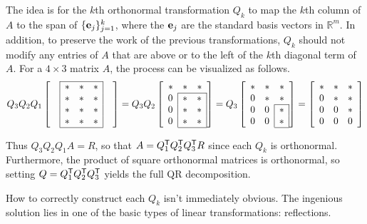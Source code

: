 The idea is for the $k$th orthonormal transformation $Q_k$ to map the $k$th column of $A$ to the span of $\{\mathbf{e}_j\}_{j=1}^k$, where the $\mathbf{e}_j$ are the standard basis vectors in $\mathbb{R}^m$.
In addition, to preserve the work of the previous transformations, $Q_k$ should not modify any entries of $A$ that are above or to the left of the $k$th diagonal term of $A$.
For a $4 \times 3$ matrix $A$, the process can be visualized as follows.
%
\begin{align*}
Q_3 Q_2 Q_1
\left[\begin{array}{ccccc}
\cline{2-4}
& \lvl{*} & * & \rvl{*} & \\
& \lvl{*} & * & \rvl{*}& \\
& \lvl{*} & * & \rvl{*} & \\
& \lvl{*} & * & \rvl{*} & \\ \cline{2-4}
\end{array}\right]
= Q_3 Q_2
\left[\begin{array}{ccc}
     *  & * &      * \\
\cline{2-3}
\rvl{0} & * & \rvl{*} \\
\rvl{0} & * & \rvl{*} \\
\rvl{0} & * & \rvl{*} \\
\cline{2-3}
\end{array}\right]
= Q_3
\left[\begin{array}{ccc}
* & * & * \\
0 & * & * \\
\cline{3-3}
0 & \rvl{0} & \rvl{*} \\
0 & \rvl{0} & \rvl{*} \\
\cline{3-3}
\end{array}\right]
=
\left[\begin{array}{ccc}
* & * & * \\
0 & * & * \\
0 & 0 & * \\
0 & 0 & 0 \\
\end{array}\right]
\end{align*}

Thus $Q_3 Q_2 Q_1 A = R$, so that $A = Q_1^{\mathsf T} Q_2^{\mathsf T} Q_3^{\mathsf T} R$ since each $Q_k$ is orthonormal.
Furthermore, the product of square orthonormal matrices is orthonormal, so setting $Q = Q_1^{\mathsf T} Q_2^{\mathsf T} Q_3^{\mathsf T}$ yields the full QR decomposition.

How to correctly construct each $Q_k$ isn't immediately obvious.
The ingenious solution lies in one of the basic types of linear transformations: reflections.

